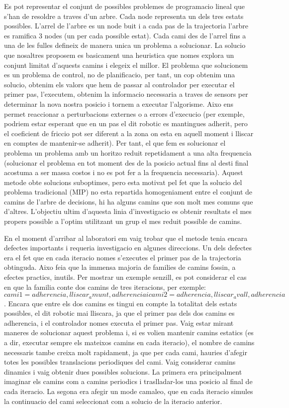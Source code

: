 \documentclass[12,twoside]{TFG-GM}
\theoremstyle{definition}
\theoremstyle{remark}
\begin{document}
Es pot representar el conjunt de possibles problemes de programacio lineal que s'han de resoldre a traves d'un arbre. Cada node representa un dels tres estats possibles. L'arrel de l'arbre es un node buit i a cada pas de la trajectoria l'arbre es ramifica 3 nodes (un per cada possible estat). Cada cami des de l'arrel fins a una de les fulles defineix de manera unica un problema a solucionar. La solucio que nosaltres proposem es basicament una heuristica que nomes explora un conjunt limitat d'aquests camins i elegeix el millor. El problema que solucionem es un problema de control, no de planificacio, per tant, un cop obtenim una solucio, obtenim els valors que hem de passar al controlador per executar el primer pas, l'executem, obtenim la informacio necessaria a traves de sensors per determinar la nova nostra posicio i tornem a executar l'algorisme. Aixo ens permet reaccionar a perturbacions externes o a errors d'execucio (per exemple, podriem estar esperant que en un pas el dit robotic es mantingues adherit, pero el coeficient de friccio pot ser diferent a la zona on esta en aquell moment i lliscar en comptes de mantenir-se adherit). Per tant, el que fem es solucionar el problema un problema amb un horitzo reduit repetidament a una alta frequencia (solucionar el problema en tot moment des de la posicio actual fins al desti final acostuma a ser massa costos i no es pot fer a la frequencia necessaria). Aquest metode obte solucions suboptimes, pero esta motivat pel fet que la solucio del problema tradicional (MIP) no esta repartida homogeniament entre el conjunt de camins de l'arbre de decisions, hi ha alguns camins que son molt mes comuns que d'altres. L'objectiu ultim d'aquesta linia d'investigacio es obtenir resultats el mes propers possible a l'optim utilitzant un grup el mes reduit possible de camins.

En el moment d'arribar al laboratori em vaig trobar que el metode tenia encara defectes importants i requeria investigacio en algunes direccions. Un dels defectes era el fet que en cada iteracio nomes s'executes el primer pas de la trajectoria obtinguda. Aixo feia que la immensa majoria de families de camins fossin, a efectes practics, inutils. Per mostrar un exemple senzill, es pot considerar el cas en que la familia conte dos camins de tres iteracions, per exemple:
$$cami1 = {adherencia, lliscar_amunt, adherencia} i cami2 = {adherencia, lliscar_avall, adherencia}$$. Encara que entre els dos camins es tingui en compte la totalitat dels estats possibles, el dit robotic mai lliscara, ja que el primer pas dels dos camins es adherencia, i el controlador nomes executa el primer pas. Vaig estar mirant maneres de solucionar aquest problema i, si es volien mantenir camins estatics (es a dir, executar sempre els mateixos camins en cada iteracio), el nombre de camins necessaris tambe creixa molt rapidament, ja que per cada cami, hauries d'afegir totes les possibles translacions periodiques del cami.
Vaig considerar camins dinamics i vaig obtenir dues possibles solucions. La primera era principalment imaginar els camins com a camins periodics i traslladar-los una posicio al final de cada iteracio.
La segona era afegir un mode camaleo, que en cada iteracio simules la continuacio del cami seleccionat com a solucio de la iteracio anterior.
\end{document}
